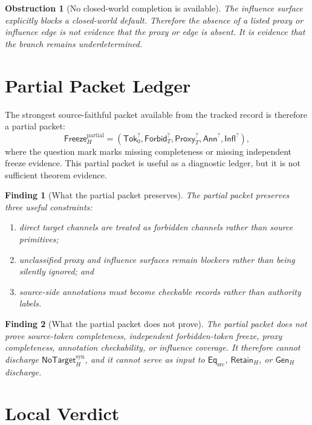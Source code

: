 \documentclass[11pt]{article}
\newcommand{\GenH}{\mathsf{Gen}_{H}}
\newcommand{\EqSrc}{\mathsf{Eq}_{\mathrm{src}}}
\newcommand{\RetainH}{\mathsf{Retain}_{H}}
\newcommand{\NoTargetSyn}{\mathsf{NoTarget}_{H}^{\mathrm{syn}}}
\newcommand{\SrcTok}{\mathsf{Tok}_{0}}
\newcommand{\ForbidT}{\mathsf{Forbid}_{T}}
\newcommand{\ProxyT}{\mathsf{Proxy}_{T}}
\newcommand{\Annot}{\mathsf{Ann}}
\newcommand{\Influence}{\mathsf{Infl}}
\newcommand{\FreezeH}{\mathsf{Freeze}_{H}}
\newtheorem{finding}{Finding}
\newtheorem{obstruction}{Obstruction}
\begin{document}
\begin{obstruction}[No closed-world completion is available]
The influence surface explicitly blocks a closed-world default. Therefore
the absence of a listed proxy or influence edge is not evidence that the
proxy or edge is absent. It is evidence that the branch remains
underdetermined.
\end{obstruction}

\section{Partial Packet Ledger}

The strongest source-faithful packet available from the tracked record is
therefore a partial packet:
\[
    \FreezeH^{\mathrm{partial}} =
    (\SrcTok^{?},\ForbidT^{?},\ProxyT^{?},\Annot^{?},\Influence^{?}),
\]
where the question mark marks missing completeness or missing independent
freeze evidence. This partial packet is useful as a diagnostic ledger, but
it is not sufficient theorem evidence.

\begin{finding}[What the partial packet preserves]
The partial packet preserves three useful constraints:
\begin{enumerate}
    \item direct target channels are treated as forbidden channels rather
    than source primitives;
    \item unclassified proxy and influence surfaces remain blockers rather
    than being silently ignored; and
    \item source-side annotations must become checkable records rather than
    authority labels.
\end{enumerate}
\end{finding}

\begin{finding}[What the partial packet does not prove]
The partial packet does not prove source-token completeness, independent
forbidden-token freeze, proxy completeness, annotation checkability, or
influence coverage. It therefore cannot discharge \(\NoTargetSyn\), and it
cannot serve as input to \(\EqSrc\), \(\RetainH\), or \(\GenH\) discharge.
\end{finding}

\section{Local Verdict}
\end{document}
